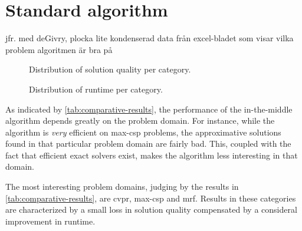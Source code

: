 \section{Standard algorithm}
jfr. med deGivry, plocka lite kondenserad data från excel-bladet som visar vilka problem algoritmen är bra på


\begin{figure}
	\centering
	
	\caption{Distribution of solution quality per category.}
	\label{fig:quality-per-paradigm}
\end{figure}

\begin{figure}
	\centering
	
	\caption{Distribution of runtime per category.}
	\label{fig:time-per-paradigm}
\end{figure}


As indicated by \cref{tab:comparative-results}, the performance of the in-the-middle algorithm depends greatly on the problem domain.
For instance, while the algorithm is \emph{very} efficient on max-\gls{csp} problems, the approximative solutions found in that particular problem domain are fairly bad.
This, coupled with the fact that efficient exact solvers exist, makes the algorithm less interesting in that domain.

The most interesting problem domains, judging by the results in \cref{tab:comparative-results}, are \gls{cvpr}, max-\gls{csp} and \gls{mrf}.
Results in these categories are characterized by a small loss in solution quality compensated by a consideral improvement in runtime.

